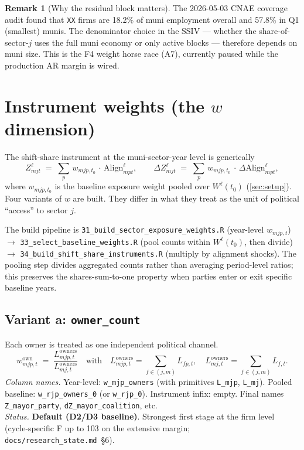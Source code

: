\documentclass[12pt]{article}
\theoremstyle{definition}
\newtheorem{remark}{Remark}
\newcommand{\Align}{\mathrm{Align}}
\begin{document}
\begin{remark}[Why the residual block matters]
The 2026-05-03 CNAE coverage audit found that \texttt{XX} firms are 18.2\% of muni employment overall and 57.8\% in Q1 (smallest) munis. The denominator choice in the SSIV --- whether the share-of-sector-$j$ uses the full muni economy or only active blocks --- therefore depends on muni size. This is the F4 weight horse race (A7), currently paused while the production AR margin is wired.
\end{remark}

\section{Instrument weights (the $w$ dimension)}
\label{sec:weights}

The shift-share instrument at the muni-sector-year level is generically
\begin{equation}
\label{eq:ssiv}
Z^{\ell}_{m j t} \;=\; \sum_{p}\, w_{m j p, t_0}\,\cdot\,\Align^{\ell}_{m p t},
\qquad
\Delta Z^{\ell}_{m j t} \;=\; \sum_{p}\, w_{m j p, t_0}\,\cdot\,\Delta \Align^{\ell}_{m p t},
\end{equation}
where $w_{m j p, t_0}$ is the baseline exposure weight pooled over $W^\ell(t_0)$ (\cref{sec:setup}). Four variants of $w$ are built. They differ in what they treat as the unit of political ``access'' to sector $j$.

The build pipeline is \texttt{31\_build\_sector\_exposure\_weights.R} (year-level $w_{m j p, t}$) $\to$ \texttt{33\_select\_baseline\_weights.R} (pool counts within $W^\ell(t_0)$, then divide) $\to$ \texttt{34\_build\_shift\_share\_instruments.R} (multiply by alignment shocks). The pooling step divides aggregated counts rather than averaging period-level ratios; this preserves the shares-sum-to-one property when parties enter or exit specific baseline years.

\subsection{Variant a: \texttt{owner\_count}}
Each owner is treated as one independent political channel.
\begin{equation}
w^{\text{own}}_{m j p, t} \;=\; \frac{L^{\text{owners}}_{m j p, t}}{L^{\text{owners}}_{m j, t}}
\quad\text{with}\quad
L^{\text{owners}}_{m j p, t} = \sum_{f \in (j,m)} L_{fp,t},
\quad
L^{\text{owners}}_{m j, t} = \sum_{f \in (j,m)} L_{f, t}.
\end{equation}
\textit{Column names.} Year-level: \texttt{w\_mjp\_owners} (with primitives \texttt{L\_mjp}, \texttt{L\_mj}). Pooled baseline: \texttt{w\_rjp\_owners\_0} (or \texttt{w\_rjp\_0}). Instrument infix: empty. Final names \texttt{Z\_mayor\_party}, \texttt{dZ\_mayor\_coalition}, etc.\\
\textit{Status.} \textbf{Default (D2/D3 baseline)}. Strongest first stage at the firm level (cycle-specific F up to 103 on the extensive margin; \texttt{docs/research\_state.md}~\S6).
\end{document}
